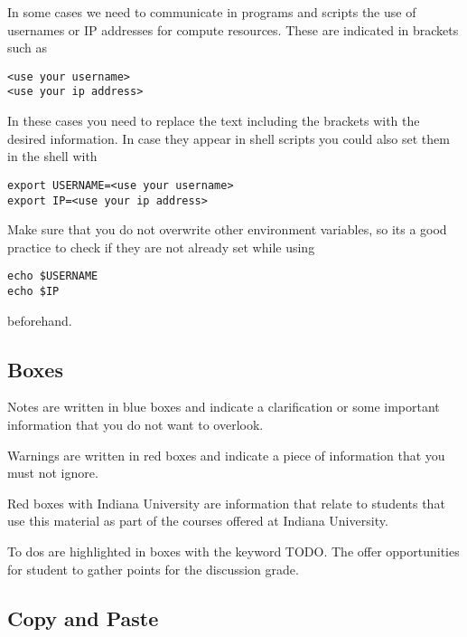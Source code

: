 In some cases we need to communicate in programs and scripts the use of usernames 
or IP addresses for compute resources. These are indicated in brackets such as

\begin{lstlisting}
<use your username>
<use your ip address>
\end{lstlisting}

In these cases you need to replace the text including the brackets 
with the desired information. In case they appear in shell scripts 
you could also set them in the shell with 

\begin{lstlisting}
export USERNAME=<use your username>
export IP=<use your ip address>
\end{lstlisting}

Make sure that you do not overwrite other environment variables, 
so its a good practice to check if they are not already set while using 

\begin{lstlisting}
echo $USERNAME
echo $IP
\end{lstlisting}

beforehand.

\subsection{Boxes}

\begin{NOTE}
Notes are written in blue boxes and indicate a clarification or some
important information that you do not want to overlook.
\end{NOTE}

\begin{WARNING}
Warnings are written in red  boxes and indicate a piece of information
that you must not ignore.
\end{WARNING}

\begin{IU}
Red boxes with Indiana University are information that relate to
students that use this material as part of the courses offered at
Indiana University.
\end{IU}

To dos are highlighted in boxes with the keyword TODO. The offer
opportunities for student to gather points for the discussion grade.


\subsection{Copy and Paste}


